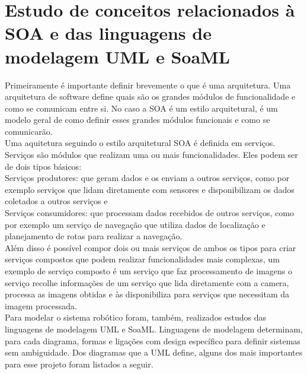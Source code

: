 \documentclass[12pt]{report}
\begin{document}
\section{Estudo de conceitos relacionados à SOA e das linguagens de modelagem UML e SoaML}
Primeiramente é importante definir brevemente o que é uma arquitetura. Uma arquitetura de software define quais são os grandes módulos de funcionalidade e como se comunicam entre si. No caso a SOA é um estilo arquitetural, é um modelo geral de como definir esses grandes módulos funcionais e como se comunicarão.\\
Uma aquitetura seguindo o estilo arquitetural SOA é definida em serviços. Serviços são módulos que realizam uma ou mais funcionalidades. Eles podem ser de dois tipos básicos:\\ 
Serviços produtores: que geram dados e os enviam a outros serviços, como por exemplo serviços que lidam diretamente com sensores e disponibilizam os dados coletados a outros serviços e\\
Serviços consumidores: que processam dados recebidos de outros serviços, como por exemplo um serviço de navegação que utiliza dados de localização e planejamento de rotas para realizar a navegação.\\
Além disso é possível compor dois ou mais serviços de ambos os tipos para criar serviços compostos que podem realizar funcionalidades mais complexas, um exemplo de serviço composto é um serviço que faz processamento de imagens o serviço recolhe informações de um serviço que lida diretamente com a camera, processa as imagens obtidas e às disponibiliza para serviços que necessitam da imagem processada.\\ 
Para modelar o sistema robótico foram, também, realizados estudos das linguagens de modelagem UML e SoaML. Linguagens de modelagem determinam, para cada diagrama, formas e ligações com design específico para definir sistemas sem ambiguidade. Dos diagramas que a UML define, alguns dos mais importantes para esse projeto foram listados a seguir.
\end{document}
